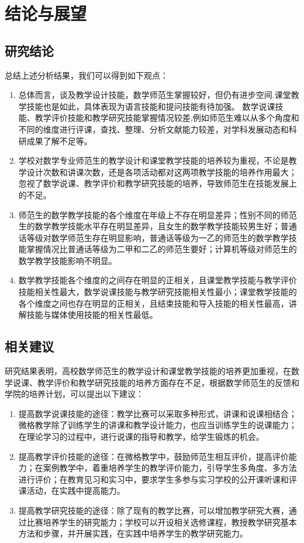 \chapter{结论与展望}


\section{研究结论}

总结上述分析结果，我们可以得到如下观点：

\begin{enumerate}[(1)]
  \item 总体而言，谈及教学设计技能，数学师范生掌握较好，但仍有进步空间.课堂教学技能也是如此，具体表现为语言技能和提问技能有待加强。 数学说课技能、教学评价技能和教学研究技能掌握情况较差,例如师范生难以从多个角度和不同的维度进行评课，查找、整理、分析文献能力较差，对学科发展动态和科研成果了解不足等。
  \item 学校对数学专业师范生的教学设计和课堂教学技能的培养较为重视，不论是教学设计次数和讲课次数，还是各项活动都对这两项教学技能的培养作用最大；忽视了数学说课、教学评价和教学研究技能的培养，导致师范生在技能发展上的不足。
  \item 师范生的数学教学技能的各个维度在年级上不存在明显差异；性别不同的师范生的数学教学技能水平存在明显差异，且女生的数学教学技能较男生好；普通话等级对数学师范生存在明显影响，普通话等级为一乙的师范生的数学教学技能掌握情况比普通话等级为二甲和二乙的师范生要好；计算机等级对师范生的数学教学技能影响不明显。
  \item 数学教学技能各个维度的之间存在明显的正相关，且课堂教学技能与教学评价技能相关性最大，数学说课技能与教学研究技能相关性最小；课堂教学技能的各个维度之间也存在明显的正相关，且结束技能和导入技能的相关性最高，讲解技能与媒体使用技能的相关性最低。
\end{enumerate}



\section{相关建议}

研究结果表明，高校数学师范生的教学设计和课堂教学技能的培养更加重视，在数学说课、教学评价和教学研究技能的培养方面存在不足，根据数学师范生的反馈和学院的培养计划，可以提出以下建议：

\begin{enumerate}[(1)]
  \item 提高数学说课技能的途径：教学比赛可以采取多种形式，讲课和说课相结合；微格教学除了训练学生的讲课和教学设计能力，也应当训练学生的说课能力；在理论学习的过程中，进行说课的指导和教学，给学生锻炼的机会。
  \item 提高教学评价技能的途径：在微格教学中，鼓励师范生相互评价，提高评价能力；在案例教学中，着重培养学生的教学评价能力，引导学生多角度、多方法进行评价；在教育见习和实习中，要求学生多参与实习学校的公开课听课和评课活动，在实践中提高能力。
  \item 提高教学研究技能的途径：除了现有的教学比赛，可以增加教学研究大赛，通过比赛培养学生的研究能力；学校可以开设相关选修课程，教授教学研究基本方法和步骤，并开展实践，在实践中培养学生的教学研究能力。
\end{enumerate}


